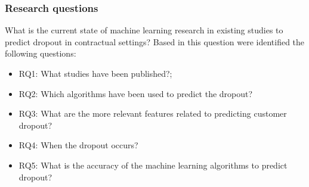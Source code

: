 \documentclass[10pt]{beamer}
\begin{document}
\begin{frame}
	\frametitle{Research questions}
	What is the current state of machine learning research in existing studies to predict dropout in contractual settings? Based in this question were identified the following questions:
	\begin{itemize}
		\item RQ1: What studies have been published?;
		\item RQ2: Which algorithms have been used to predict the dropout?
		\item RQ3: What are the more relevant features related to predicting customer dropout?
		\item RQ4: When the dropout occurs? 
		\item RQ5: What is the accuracy of the machine learning algorithms to predict dropout?
	\end{itemize}
\end{frame}

\end{document}
